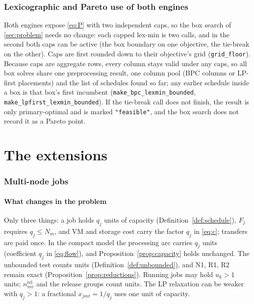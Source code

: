 \documentclass[11pt,a4paper]{article}
\theoremstyle{definition}
\theoremstyle{remark}
\newcommand{\code}[1]{\texttt{#1}}
\newcommand{\nrel}{n^{\mathrm{rel}}}
\begin{document}
\section{Lexicographic and Pareto use of both engines}\label{sec:lex}

Both engines expose \eqref{eq:P} with two independent caps, so the box search
of \cref{sec:problem} needs no change: each capped lex-min is two calls, and in
the second both caps can be active (the box boundary on one objective, the
tie-break on the other). Caps are first rounded down to their objective's grid
(\code{grid\_floor}). Because caps are aggregate rows, every column stays valid
under any caps, so all box solves share one preprocessing result, one column
pool (BPC columns or LP-first placements) and the list of schedules found so
far; any earlier schedule inside a box is that box's first incumbent
(\code{make\_bpc\_lexmin\_bounded}, \code{make\_lpfirst\_lexmin\_bounded}). If
the tie-break call does not finish, the result is only primary-optimal and is
marked \code{"feasible"}, and the box search does not record it as a Pareto
point.

\part*{The extensions}

\section{Multi-node jobs}\label{sec:multinode}

\subsection{What changes in the problem}
Only three things: a job holds $q_j$ units of capacity
(Definition~\ref{def:schedule}), $F_j$ requires $q_j\le N_m$, and VM and storage cost
carry the factor $q_j$ in \eqref{eq:c}; transfers are paid once. In the compact
model the processing arc carries $q_j$ units (coefficient $q_j$ in
\eqref{eq:flow}), and Proposition~\ref{prop:capacity} holds unchanged. The unbounded test
counts units (Definition~\ref{def:unbounded}), and N1, R1, R2 remain exact
(Proposition~\ref{prop:reductions}). Running jobs may hold $u_k>1$ units; $\nrel_{mv}$ and
the release groups count units. The LP relaxation can be weaker with $q_j>1$:
a fractional $x_{jmt}=1/q_j$ uses one unit of capacity.
\end{document}

